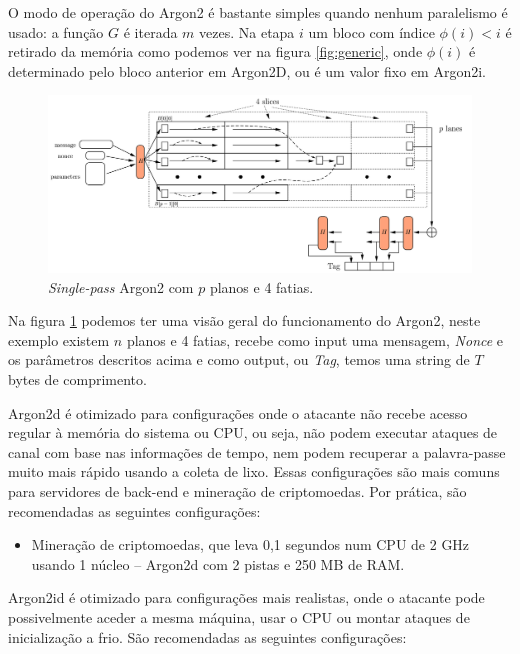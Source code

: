\documentclass[conference]{IEEEtran}
\begin{document}
O modo de operação do Argon2 é bastante simples quando nenhum paralelismo é usado: 
a função ${G}$ é iterada $m$ vezes. Na etapa $i$ um bloco com índice $\phi(i)<i$ é retirado 
da memória como podemos ver na figura \ref{fig:generic}, onde $\phi(i)$ é determinado pelo 
bloco anterior em Argon2D, ou é um valor fixo em Argon2i.

\begin{figure}[ht]
\centering
\includegraphics[scale=0.1]{assets/single-pass-argon2.png}
\caption{\textit{Single-pass} Argon2 com $p$ planos e 4 fatias. }\label{fig:argon2}
\end{figure}

Na figura \ref{fig:argon2} podemos ter uma visão geral do funcionamento do Argon2, 
neste exemplo existem $n$ planos e 4 fatias, recebe como input uma mensagem, \textit{Nonce} 
e os parâmetros descritos acima e como output, ou \textit{Tag}, temos uma string de $T$ 
bytes de comprimento. \cite{argon2spec}

Argon2d é otimizado para configurações onde o atacante não recebe
acesso regular à memória do sistema ou CPU, ou seja, não podem executar
ataques de canal com base nas informações de tempo, nem podem recuperar
a palavra-passe muito mais rápido usando a coleta de lixo. Essas configurações
são mais comuns para servidores de back-end e mineração de criptomoedas. Por
prática, são recomendadas as seguintes configurações:

\begin{itemize}
\item Mineração de criptomoedas, que leva 0,1 segundos num CPU de 2 GHz
usando 1 núcleo -- Argon2d com 2 pistas e 250 MB de RAM.
\end{itemize}

Argon2id é otimizado para configurações mais realistas, onde o
atacante pode possivelmente aceder a mesma máquina, usar o CPU ou montar
ataques de inicialização a frio. São recomendadas as seguintes configurações:
\end{document}

